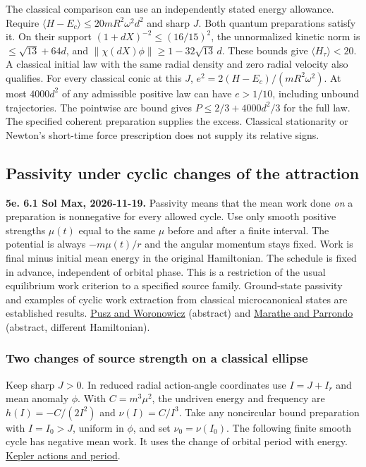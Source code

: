 \documentclass[11pt,a4paper]{article}
\begin{document}
The classical comparison can use an independently stated energy
allowance. Require \(\langle H-E_c\rangle\le20mR^2\omega^2d^2\) and
sharp \(J\). Both quantum preparations satisfy it. On their support
\((1+dX)^{-2}\le(16/15)^2\), the unnormalized kinetic norm is
\(\le\sqrt{13}+64d\), and \(\|\chi(dX)\phi\|\ge1-32\sqrt{13}\,d\). These
bounds give \(\langle H_\tau\rangle<20\). A classical initial law with
the same radial density and zero radial velocity also qualifies. For
every classical conic at this \(J\), \(e^2=2(H-E_c)/(mR^2\omega^2)\). At
most \(4000d^2\) of any admissible positive law can have \(e>1/10\),
including unbound trajectories. The pointwise arc bound gives
\(P\le 2/3+4000d^2/3\) for the full law. The specified coherent
preparation supplies the excess. Classical stationarity or Newton's
short-time force prescription does not supply its relative signs.

\subsection{Passivity under cyclic changes of the
attraction}\label{passivity-under-cyclic-changes-of-the-attraction}

\textbf{5e. 6.1 Sol Max, 2026-11-19.} Passivity means that the mean work
done \emph{on} a preparation is nonnegative for every allowed cycle. Use
only smooth positive strengths \(\mu(t)\) equal to the same \(\mu\)
before and after a finite interval. The potential is always
\(-m\mu(t)/r\) and the angular momentum stays fixed. Work is final minus
initial mean energy in the original Hamiltonian. The schedule is fixed
in advance, independent of orbital phase. This is a restriction of the
usual equilibrium work criterion to a specified source family.
Ground-state passivity and examples of cyclic work extraction from
classical microcanonical states are established results.
\href{https://link.springer.com/article/10.1007/BF01614224}{Pusz and
Woronowicz} (abstract) and
\href{https://arxiv.org/abs/0909.0671}{Marathe and Parrondo} (abstract,
different Hamiltonian).

\subsubsection{Two changes of source strength on a classical
ellipse}\label{two-changes-of-source-strength-on-a-classical-ellipse}

Keep sharp \(J>0\). In reduced radial action-angle coordinates use
\(I=J+I_r\) and mean anomaly \(\phi\). With \(C=m^3\mu^2\), the undriven
energy and frequency are \(h(I)=-C/(2I^2)\) and \(\nu(I)=C/I^3\). Take
any noncircular bound preparation with \(I=I_0>J\), uniform in \(\phi\),
and set \(\nu_0=\nu(I_0)\). The following finite smooth cycle has
negative mean work. It uses the change of orbital period with energy.
\href{rivero-1998-conjecture-central-forces.md\#5-hooke-and-kepler-radial-actions-and-maslov-phases}{Kepler
actions and period}.
\end{document}

